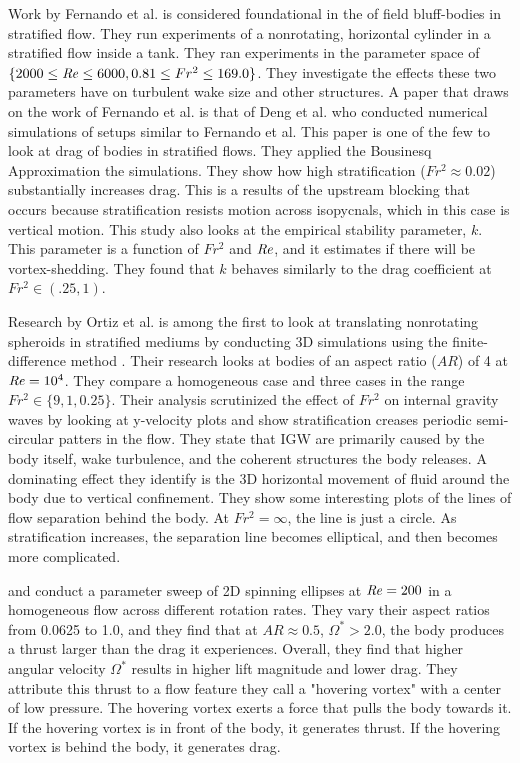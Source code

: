 Work by Fernando et al. is considered foundational in the of field bluff-bodies in stratified flow. They run experiments of a nonrotating, horizontal cylinder in a stratified flow inside a tank. They ran experiments in the parameter space of $\{2000 \leq \mathit{Re} \leq 6000, 0.81 \leq Fr^2 \leq  169.0\}$. They investigate the effects these two parameters have on turbulent wake size and other structures. A paper that draws on the work of Fernando et al. is that of Deng et al. \cite{deng_drag_2022} who conducted numerical simulations of setups similar to Fernando et al. This paper is one of the few to look at drag of bodies in stratified flows. They applied the Bousinesq Approximation the simulations. They show how high stratification ($Fr^2 \approx 0.02$) substantially increases drag. This is a results of the upstream blocking that occurs because stratification resists motion across isopycnals, which in this case is vertical motion. This study also looks at the empirical stability parameter, $k$. This parameter is a function of $Fr^2$ and $\mathit{Re}$, and it estimates if there will be vortex-shedding. They found that $k$ behaves similarly to the drag coefficient at $Fr^2 \in (.25, 1)$.

Research by Ortiz et al. \cite{ortiz-tarin_stratified_2019} is among the first to look at translating nonrotating spheroids in stratified mediums by conducting 3D simulations using the finite-difference method . Their research looks at bodies of an aspect ratio ($AR$) of 4 at $\mathit{Re} = 10^4$. They compare a homogeneous case and three cases in the range $Fr^2 \in \{9, 1, 0.25\}$. Their analysis scrutinized the effect of $Fr^2$ on internal gravity waves by looking at y-velocity plots and show stratification creases periodic semi-circular patters in the flow. They state that IGW are primarily caused by the body itself, wake turbulence, and the coherent structures the body releases. A dominating effect they identify is the 3D horizontal movement of fluid around the body due to vertical confinement. They show some interesting plots of the lines of flow separation behind the body. At $Fr^2 = \infty$, the line is just a circle. As stratification increases, the separation line becomes elliptical, and then becomes more complicated. 

\cite{lu_flow_2018} and \cite{lua_rotating_2018} conduct a parameter sweep of 2D spinning ellipses at $\mathit{Re} = 200$ in a homogeneous flow across different rotation rates. They vary their aspect ratios from 0.0625 to 1.0, and they find that at $AR \approx 0.5$, $\Omega^{\ast} > 2.0$, the body produces a thrust larger than the drag it experiences.  Overall, they find that higher angular velocity $\Omega^{\ast}$ results in higher lift magnitude and lower drag. They attribute this thrust to a flow feature they call a "hovering vortex" with a center of low pressure. The hovering vortex exerts a force that pulls the body towards it. If the hovering vortex is in front of the body, it generates thrust. If the hovering vortex is behind the body, it generates drag. 

